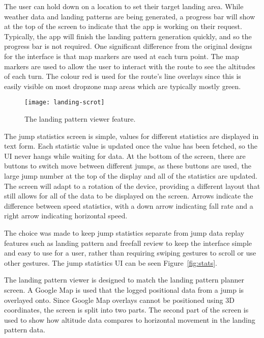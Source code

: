 The user can hold down on a location to set their target landing area. While weather data and landing patterns are being generated, a progress bar will show at the top of the screen to indicate that the app is working on their request. Typically, the app will finish the landing pattern generation quickly, and so the progress bar is not required. One significant difference from the original designs for the interface is that map markers are used at each turn point. The map markers are used to allow the user to interact with the route to see the altitudes of each turn. The colour red is used for the route's line overlays since this is easily visible on most dropzone map areas which are typically mostly green.

\begin{wrapfigure}{l}{0.25\textwidth}
    \centering
    \texttt{[image: landing-scrot]}
    \caption{The landing pattern viewer feature.}\label{fig:landing-scrot}
\end{wrapfigure}

The jump statistics screen is simple, values for different statistics are displayed in text form. Each statistic value is updated once the value has been fetched, so the UI never hangs while waiting for data. At the bottom of the screen, there are buttons to switch move between different jumps, as these buttons are used, the large jump number at the top of the display and all of the statistics are updated. The screen will adapt to a rotation of the device, providing a different layout that still allows for all of the data to be displayed on the screen. Arrows indicate the difference between speed statistics, with a down arrow indicating fall rate and a right arrow indicating horizontal speed.

The choice was made to keep jump statistics separate from jump data replay features such as landing pattern and freefall review to keep the interface simple and easy to use for a user, rather than requiring swiping gestures to scroll or use other gestures.
The jump statistics UI can be seen Figure~\ref{fig:stats}.

The landing pattern viewer is designed to match the landing pattern planner screen. A Google Map is used that the logged positional data from a jump is overlayed onto. Since Google Map overlays cannot be positioned using 3D coordinates, the screen is split into two parts. The second part of the screen is used to show how altitude data compares to horizontal movement in the landing pattern data.

